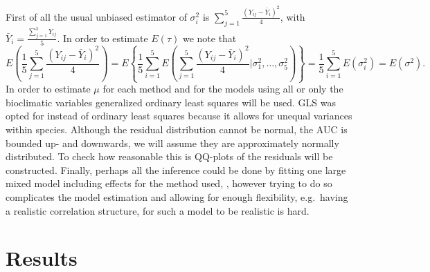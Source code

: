 First of all the usual unbiased estimator of $\sigma_i^2$ is $\sum_{j= 1}^{5} \frac{(Y_{ij} - \bar{Y}_i)^2}{4} $, with $\bar{Y}_i = \frac{\sum_{j=1}^{5}Y_{ij}}{5}$.
In order to estimate $E(\tau)$ we note that 
\[E\left(\frac{1}{5} \sum_{j= 1}^{5} \frac{(Y_{ij} - \bar{Y}_i)^2}{4}\right) = E\left\lbrace \frac{1}{5} \sum_{i=1}^5 E\left( \sum_{j= 1}^{5} \frac{(Y_{ij} - \bar{Y}_i)^2}{4}  \bigg\vert \sigma_1^2, \ldots, \sigma_5^2 \right) \right\rbrace = \frac{1}{5} \sum_{i=1}^5 E \left( \sigma_i ^ 2 \right) = E\left( \sigma^2 \right). \]
In order to estimate $\mu$ for each method and for the models using all or only the bioclimatic variables generalized ordinary least squares will be used. GLS was opted for instead of ordinary least squares because it allows for unequal variances within species. Although the residual distribution cannot be normal, the AUC is bounded up- and downwards, we will assume they are approximately normally distributed. To check how reasonable this is QQ-plots of the residuals will be constructed. Finally, perhaps all the inference could be done by fitting one large mixed model including effects for the method used, , however trying to do so complicates the model estimation and allowing for enough flexibility, e.g.\ having a realistic correlation structure, for such a model to be realistic is hard.

\section{Results}


